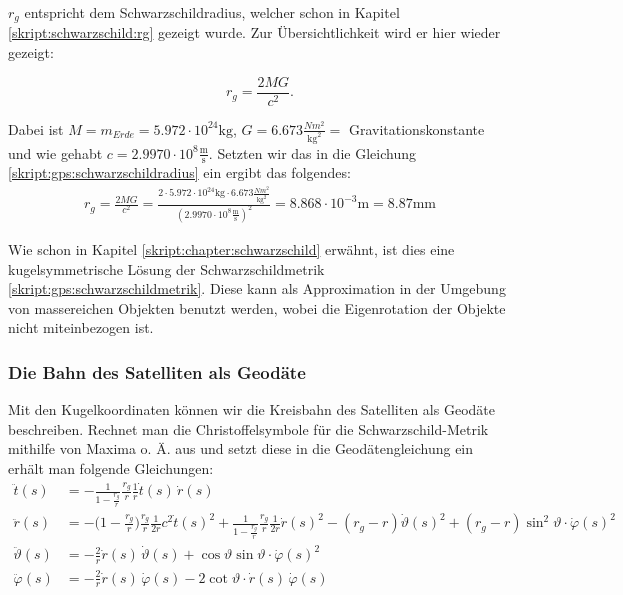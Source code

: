 \begin{refsection}
\noindent{}$r_g$ entspricht dem Schwarzschildradius, welcher schon in Kapitel \ref{skript:schwarzschild:rg} gezeigt wurde. Zur Übersichtlichkeit wird er hier wieder gezeigt:

\begin{equation}
 r_g=\frac{2MG}{c^2}.
\label{skript:gps:schwarzschildradius}
\end{equation}

\noindent{}Dabei ist \( M = m_{Erde} = 5.972 \cdot 10^{24}\text{kg} \), \( G = 6.673 \frac{Nm^2}{\text{kg}^2} = \) Gravitationskonstante und wie gehabt \( c = 2.9970 \cdot 10^8 \frac{\text{m}}{\text{s}} \). Setzten wir das in die Gleichung \eqref{skript:gps:schwarzschildradius} ein ergibt das folgendes:\\
\begin{align*}
r_g=\frac{2MG}{c^2} = \frac{2 \cdot 5.972 \cdot 10^{24}\text{kg} \cdot  6.673 \frac{Nm^2}{\text{kg}^2}}{ (2.9970 \cdot 10^8 \frac{\text{m}}{\text{s}})^2} = 8.868 \cdot 10^{-3}\text{m} = 8.87\text{mm}
\end{align*}

Wie schon in Kapitel \ref{skript:chapter:schwarzschild} erwähnt, ist dies eine kugelsymmetrische Lösung der Schwarzschildmetrik \eqref{skript:gps:schwarzschildmetrik}. Diese kann als Approximation in der Umgebung von massereichen Objekten benutzt werden, wobei die Eigenrotation der Objekte nicht miteinbezogen ist.

\subsubsection{Die Bahn des Satelliten als Geodäte}
Mit den Kugelkoordinaten können wir die Kreisbahn des Satelliten als Geodäte beschreiben. Rechnet man die Christoffelsymbole für die Schwarzschild-Metrik mithilfe von Maxima o. Ä. aus und setzt diese in die Geodätengleichung ein erhält man folgende Gleichungen:
\begin{align*}
\ddot t(s)
&=
-\frac{1}{1-\displaystyle\frac{r_g}{r}}\frac{r_g}{r}\frac{1}{r}\dot t(s)\,\dot r(s)
\\
\ddot r(s)
&=
-\biggl(1-\frac{r_g}{r}\biggr)\frac{r_g}{r}\frac1{2r}c^2\dot t(s)^2
+\frac{1}{1-\displaystyle\frac{r_g}{r}} \frac{r_g}{r}\frac1{2r}\dot r(s)^2
-(r_g-r)\dot \vartheta(s)^2 + (r_g-r)\sin^2 \vartheta \cdot \dot \varphi(s)^2
\\
\ddot \vartheta(s)
&=
-\frac{2}{r} \dot r(s)\, \dot \vartheta(s)
+\cos\vartheta\sin\vartheta \cdot \dot\varphi(s)^2
\\
\ddot \varphi(s)
&=
-\frac{2}{r} \dot r(s)\,\dot \varphi(s)
-2\cot\vartheta \cdot \dot r(s)\,\dot\varphi(s)
\end{align*}


\end{refsection}
